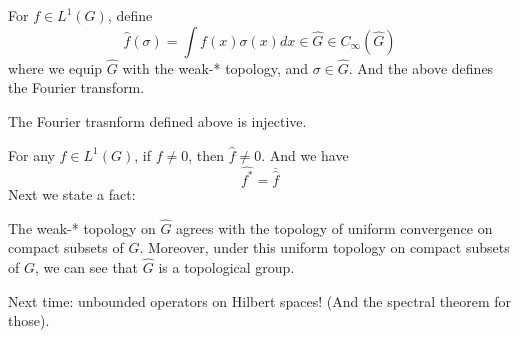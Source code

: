For $f\in L^1(G)$, define
\begin{equation*}
    \widehat{f}(\sigma)=\int f(x)\sigma(x)dx\in\widehat{G}\in C_\infty(\widehat{G})
\end{equation*}
where we equip $\widehat{G}$ with the weak-* topology, and $\sigma\in\widehat{G}$. And the above defines the Fourier transform.
\begin{corollary}
    The Fourier trasnform defined above is injective.
\end{corollary}
For any $f\in L^1(G)$, if $f\neq 0$, then $\widehat{f}\neq 0$. And we have
\begin{equation*}
    \widehat{f^*}=\overline{\widehat{f}}
\end{equation*}
Next we state a fact: 
\begin{proposition}
    The weak-* topology on $\widehat{G}$ agrees with the topology of uniform convergence on compact subsets of $G$. Moreover, under this uniform topology on compact subsets of $G$, we can see that $\widehat{G}$ is a topological group.
\end{proposition}
Next time: unbounded operators on Hilbert spaces! (And the spectral theorem for those).

